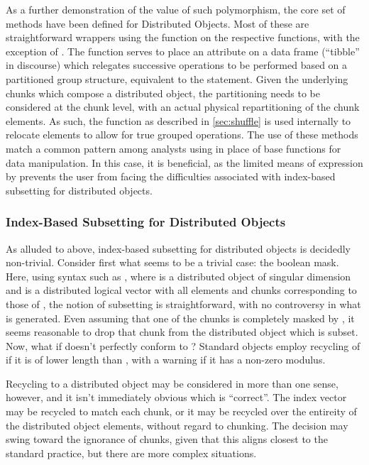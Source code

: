 As a further demonstration of the value of such polymorphism, the core set of  methods have been defined for Distributed Objects.
Most of these are straightforward wrappers using the  function on the respective  functions, with the exception of .
The  function serves to place an attribute on a data frame (``tibble'' in  discourse) which relegates successive operations to be performed based on a partitioned group structure, equivalent to the   statement.
Given the underlying chunks which compose a distributed object, the partitioning needs to be considered at the chunk level, with an actual physical repartitioning of the chunk elements.
As such, the  function as described in \cref{sec:shuffle} is used internally to relocate elements to allow for true grouped operations.
The use of these methods match a common pattern among analysts using  in place of base \R functions for data manipulation.
In this case, it is beneficial, as the limited means of expression by  prevents the user from facing the difficulties associated with index-based subsetting for distributed objects.

\subsubsection{Index-Based Subsetting for Distributed Objects}

As alluded to above, index-based subsetting for distributed objects is decidedly non-trivial.
Consider first what seems to be a trivial case: the boolean mask.
Here, using syntax such as , where  is a distributed object of singular dimension and  is a distributed logical vector with all elements and chunks corresponding to those of , the notion of subsetting is straightforward, with no controversy in what is generated.
Even assuming that one of the chunks is completely masked by , it seems reasonable to drop that chunk from the distributed object which is subset.
Now, what if  doesn't perfectly conform to ?
Standard \R objects employ recycling of  if it is of lower length than , with a warning if it has a non-zero modulus.

Recycling to a distributed object may be considered in more than one sense, however, and it isn't immediately obvious which is ``correct''.
The index vector may be recycled to match each chunk, or it may be recycled over the entireity of the distributed object elements, without regard to chunking.
The decision may swing toward the ignorance of chunks, given that this aligns closest to the standard \R practice, but there are more complex situations.

